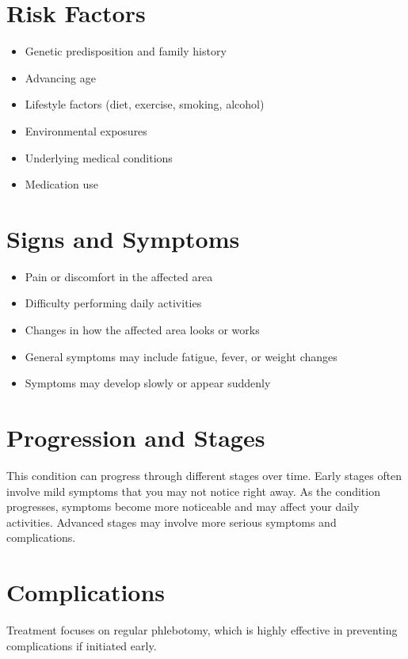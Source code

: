 \section{Risk Factors}

\begin{itemize}[noitemsep]
  \item Genetic predisposition and family history
  \item Advancing age
  \item Lifestyle factors (diet, exercise, smoking, alcohol)
  \item Environmental exposures
  \item Underlying medical conditions
  \item Medication use
\end{itemize}

\section{Signs and Symptoms}

\begin{itemize}[noitemsep]
  \item Pain or discomfort in the affected area
  \item Difficulty performing daily activities
  \item Changes in how the affected area looks or works
  \item General symptoms may include fatigue, fever, or weight changes
  \item Symptoms may develop slowly or appear suddenly
\end{itemize}

\section{Progression and Stages}
This condition can progress through different stages over time. Early stages often involve mild symptoms that you may not notice right away. As the condition progresses, symptoms become more noticeable and may affect your daily activities. Advanced stages may involve more serious symptoms and complications.

\section{Complications}
Treatment focuses on regular phlebotomy, which is highly effective in preventing complications if initiated early.

